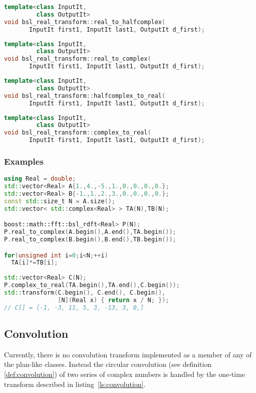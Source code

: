 \begin{lstlisting}[language=C++,caption=One-time transform real to halfcomplex.]
template<class InputIt,
         class OutputIt>
void bsl_real_transform::real_to_halfcomplex(
       InputIt first1, InputIt last1, OutputIt d_first);
\end{lstlisting}
\begin{lstlisting}[language=C++,caption=One-time transform real to complex.]
template<class InputIt,
         class OutputIt>
void bsl_real_transform::real_to_complex(
       InputIt first1, InputIt last1, OutputIt d_first);
\end{lstlisting}
\begin{lstlisting}[language=C++,caption=One-time transform halfcomplex to real.]
template<class InputIt,
         class OutputIt>
void bsl_real_transform::halfcomplex_to_real(
       InputIt first1, InputIt last1, OutputIt d_first);
\end{lstlisting}
\begin{lstlisting}[language=C++,caption=One-time transform complex to real.]
template<class InputIt,
         class OutputIt>
void bsl_real_transform::complex_to_real(
       InputIt first1, InputIt last1, OutputIt d_first);
\end{lstlisting}

\subsubsection*{Examples}
\begin{lstlisting}[language=C++,caption=Polynomial multiplication.]
using Real = double;
std::vector<Real> A{1.,4.,-5.,1.,0.,0.,0.,0.};
std::vector<Real> B{-1.,1.,2.,3.,0.,0.,0.,0.};
const std::size_t N = A.size();
std::vector< std::complex<Real> > TA(N),TB(N);

boost::math::fft::bsl_rdft<Real> P(N); 
P.real_to_complex(A.begin(),A.end(),TA.begin());
P.real_to_complex(B.begin(),B.end(),TB.begin());

for(unsigned int i=0;i<N;++i)
  TA[i]*=TB[i];
  
std::vector<Real> C(N);
P.complex_to_real(TA.begin(),TA.end(),C.begin());
std::transform(C.begin(), C.end(), C.begin(),
               [N](Real x) { return x / N; });
// C[] = [-1, -3, 11, 5, 3, -13, 3, 0,]
\end{lstlisting}

\subsection{Convolution}
Currently, there is no convolution transform implemented as a member of any of
the plan-like classes. Instead the circular convolution (see definition
\ref{def:convolution}) of two series of complex
numbers is handled by the one-time transform described in listing~\ref{ls:convolution}.
    

